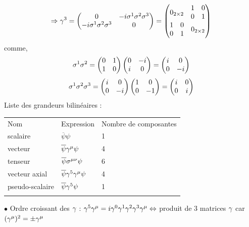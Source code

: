 \[
\Rightarrow\gamma^3 =
\begin{pmatrix}0&-i\sigma^1\sigma^2\sigma^3\\-i\sigma^1\sigma^2\sigma^3&0\end{pmatrix}
= \begin{pmatrix} 0_{2\times 2} & 
\begin{matrix} 1 & 0 \\ 0 & 1 \end{matrix}
 \\ 
\begin{matrix} 1 & 0 \\ 0 & 1 \end{matrix}
 & 0_{2\times 2} \end{pmatrix}
\]
comme,
\[
\sigma^1\sigma^2=\begin{pmatrix} 0 & 1 \\ 1 & 0 \end{pmatrix}
\begin{pmatrix}0&-i\\i&0\end{pmatrix}=\begin{pmatrix}i&0\\0&-i\end{pmatrix}
\]
\[
\sigma^1\sigma^2\sigma^3=\begin{pmatrix} i & 0 \\ 0 & -i \end{pmatrix}
\begin{pmatrix}1&0\\0&-1\end{pmatrix}=\begin{pmatrix}i&0\\0&i\end{pmatrix}
\]
Liste des grandeurs bilinéaires :

\begin{tabular}{lll}
Nom & Expression & Nombre de composantes\\
scalaire & $\overline{\psi}\psi$ & 1\\
vecteur & $\overline{\psi}\gamma^{\mu}\psi$ & 4\\
tenseur & $\overline{\psi}\sigma^{\mu\nu}\psi$ & 6\\
vecteur axial & $\overline{\psi}\gamma^5\gamma^{\mu}\psi$ & 4\\
pseudo-scalaire & $\overline{\psi}\gamma^5\psi$ & 1\\
 &  & \\
\end{tabular}

$\bullet$ Ordre croissant des $\gamma$ : $\gamma^5\gamma^\mu=i\gamma^0\gamma^1\gamma^2\gamma^3
\gamma^\mu\Leftrightarrow$ produit de 3 matrices $\gamma$ car $(\gamma^\mu)^2=\pm\gamma^\mu$


